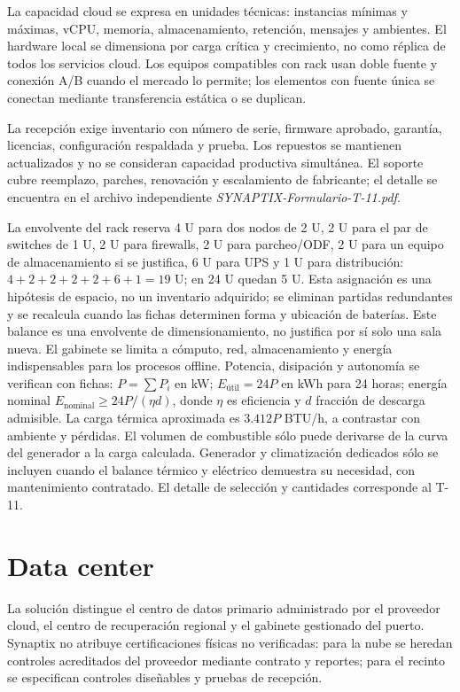 \documentclass[11pt,letterpaper]{report}
\begin{document}
La capacidad cloud se expresa en unidades técnicas: instancias mínimas y máximas, vCPU, memoria, almacenamiento, retención, mensajes y ambientes. El hardware local se dimensiona por carga crítica y crecimiento, no como réplica de todos los servicios cloud. Los equipos compatibles con rack usan doble fuente y conexión A/B cuando el mercado lo permite; los elementos con fuente única se conectan mediante transferencia estática o se duplican.

La recepción exige inventario con número de serie, firmware aprobado, garantía, licencias, configuración respaldada y prueba. Los repuestos se mantienen actualizados y no se consideran capacidad productiva simultánea. El soporte cubre reemplazo, parches, renovación y escalamiento de fabricante; el detalle se encuentra en el archivo independiente \textit{SYNAPTIX-Formulario-T-11.pdf}.

La envolvente del rack reserva 4 U para dos nodos de 2 U, 2 U para el par de switches de 1 U, 2 U para firewalls, 2 U para parcheo/ODF, 2 U para un equipo de almacenamiento si se justifica, 6 U para UPS y 1 U para distribución: $4+2+2+2+2+6+1=19$ U; en 24 U quedan 5 U. Esta asignación es una hipótesis de espacio, no un inventario adquirido; se eliminan partidas redundantes y se recalcula cuando las fichas determinen forma y ubicación de baterías. Este balance es una envolvente de dimensionamiento, no justifica por sí solo una sala nueva. El gabinete se limita a cómputo, red, almacenamiento y energía indispensables para los procesos offline. Potencia, disipación y autonomía se verifican con fichas: $P=\sum P_i$ en kW; $E_{\mathrm{útil}}=24P$ en kWh para 24 horas; energía nominal $E_{\mathrm{nominal}}\geq24P/(\eta d)$, donde $\eta$ es eficiencia y $d$ fracción de descarga admisible. La carga térmica aproximada es $3.412P$ BTU/h, a contrastar con ambiente y pérdidas. El volumen de combustible sólo puede derivarse de la curva del generador a la carga calculada. Generador y climatización dedicados sólo se incluyen cuando el balance térmico y eléctrico demuestra su necesidad, con mantenimiento contratado. El detalle de selección y cantidades corresponde al T-11.

\section{Data center}

La solución distingue el centro de datos primario administrado por el proveedor cloud, el centro de recuperación regional y el gabinete gestionado del puerto. Synaptix no atribuye certificaciones físicas no verificadas: para la nube se heredan controles acreditados del proveedor mediante contrato y reportes; para el recinto se especifican controles diseñables y pruebas de recepción.
\end{document}
